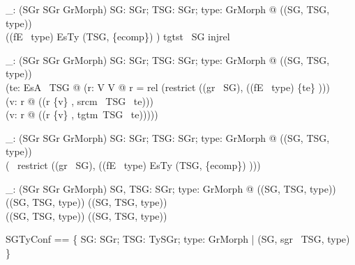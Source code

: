 \begin{axdef}
  \containmentNoSharing\_: \power  (SGr \cross  SGr \cross  GrMorph)
\where
  \forall  SG: SGr; TSG: SGr; type: GrMorph @ (\containmentNoSharing (SG, TSG, type)) \iff  \\ \quad 
  ((fE~ type) \inv  \limg  EsTy (TSG, \{ecomp\}) \rimg ) \dres  tgtst~ SG \in injrel
\end{axdef}

\begin{axdef}
  \instMultsOk\_: \power  (SGr \cross  SGr \cross  GrMorph)
\where
  \forall  SG: SGr; TSG: SGr; type: GrMorph @ (\instMultsOk (SG, TSG, type)) \iff \\ \quad 
   (\forall  te: EsA~ TSG @ (\exists  r: V \rel  V @ r = rel (restrict ((gr~ SG), ((fE~ type) \inv  \limg  \{te\} \rimg ))) \\ \quad 
    \land  (\forall  v: \dom  r @ (\multOk (r \limg  \{v\} \rimg , srcm~ TSG~ te))) \\ \quad  
    \land  (\forall  v: \ran  r @ (\multOk (r \inv  \limg  \{v\} \rimg , tgtm~TSG~ te)))))
\end{axdef}


\begin{axdef}
  \instContainmentAcyclic\_: \power  (SGr \cross  SGr \cross  GrMorph)
\where
  \forall  SG: SGr; TSG: SGr; type: GrMorph @ (\instContainmentAcyclic (SG, TSG, type)) \iff \\ \quad 
   (\acyclicG~ restrict ((gr~ SG), ((fE~ type) \inv  \limg  EsTy (TSG, \{ecomp\}) \rimg )))
\end{axdef}

\begin{axdef}
  \isConformable\_: \power  (SGr \cross  SGr \cross  GrMorph)
\where
  \forall  SG, TSG: SGr; type: GrMorph @ (\isConformable (SG, TSG, type)) \iff  \\ \quad  
  (\abstractNoDirectInstances (SG, TSG, type)) \land  (\containmentNoSharing (SG, TSG, type)) \\ \quad
  \land  (\instMultsOk (SG, TSG, type)) \land  (\instContainmentAcyclic (SG, TSG, type))
\end{axdef}

\begin{zed}
SGTyConf == \{  SG: SGr; TSG: TySGr; type: GrMorph | \isConformable (SG, sgr~ TSG, type) \}
\end{zed}

